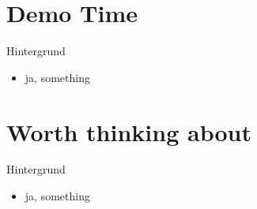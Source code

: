 	\section{Demo Time}
	\begin{frame}{Hintergrund}

		\begin{itemize}
			\item ja, something
		\end{itemize}

	\end{frame}


	\section{Worth thinking about}
	\begin{frame}{Hintergrund}

		\begin{itemize}
			\item ja, something
		\end{itemize}

	\end{frame}
%
